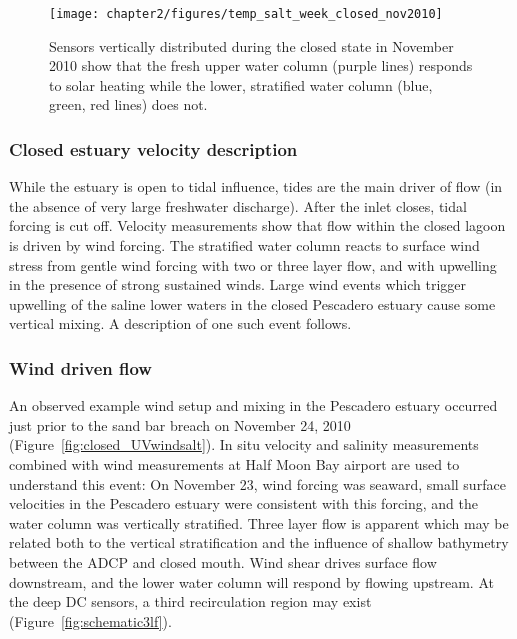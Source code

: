 \begin{figure}
\centering
	\texttt{[image: chapter2/figures/temp\_salt\_week\_closed\_nov2010]}
	\caption{Sensors vertically distributed during the closed state in November 2010 show that the fresh upper water column (purple lines) responds to solar heating while the lower, stratified water column (blue, green, red lines) does not.} \label{fig:temp_and_strat}
\end{figure}

\subsubsection{Closed estuary velocity description} \label{cl_vel}
While the estuary is open to tidal influence, tides are the main driver of flow (in the absence of very large freshwater discharge). After the inlet closes, tidal forcing is cut off. Velocity measurements show that flow within the closed lagoon is driven by wind forcing. The stratified water column reacts to surface wind stress from gentle wind forcing with two or three layer flow, and with upwelling in the presence of strong sustained winds. Large wind events which trigger upwelling of the saline lower waters in the closed Pescadero estuary cause some vertical mixing. A description of one such event follows.

\subsubsection{Wind driven flow} \label{sssec:WindMixNov10}

An observed example wind setup and mixing in the Pescadero estuary occurred just prior to the sand bar breach on November 24, 2010 (Figure~\ref{fig:closed_UVwindsalt}). In situ velocity and salinity measurements combined with wind measurements at Half Moon Bay airport are used to understand this event: 
On November 23, wind forcing was seaward, small surface velocities in the Pescadero estuary were consistent with this forcing, and the water column was vertically stratified. Three layer flow is apparent which may be related both to the vertical stratification and the influence of shallow bathymetry between the ADCP and closed mouth. Wind shear drives surface flow downstream, and the lower water column will respond by flowing upstream. At the deep DC sensors, a third recirculation region may exist (Figure~\ref{fig:schematic3lf}).


